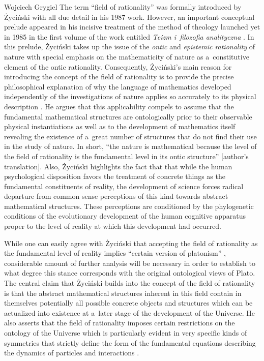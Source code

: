 \begin{artengenv}{Wojciech Grygiel}
The term ``field of rationality'' was formally introduced by Życiński with all due detail in his 1987 work. However, an important conceptual prelude appeared in his incisive treatment of the method of theology launched yet in 1985 in the first volume of the work entitled \textit{Teizm i~filozofia analityczna}
\parencite[][pp.187–207]{zycinski_teizm_1985}. %
 In this prelude, Życiński takes up the issue of the \textit{ontic} and \textit{epistemic rationality} of nature with special emphasis on the mathematicity of nature as a~constitutive element of the ontic rationality. Consequently, Życiński's main reason for introducing the concept of the field of rationality is to provide the precise philosophical explanation of why the language of mathematics developed independently of the investigations of nature applies so accurately to its physical description 
\parencite[][]{zycinski_filozoficzne_1987}. %
 He argues that this applicability compels to assume that the fundamental mathematical structures are ontologically prior to their observable physical instantiations as well as to the development of mathematics itself revealing the existence of a~great number of structures that do not find their use in the study of nature. In short, ``the nature is mathematical because the level of the field of rationality is the fundamental level in its ontic structure'' 
\parencite[][p.176]{zycinski_filozoficzne_1987} %
 [author's translation]. Also, Życiński highlights the fact that that while the human psychological disposition favors the treatment of concrete things as the fundamental constituents of reality, the development of science forces radical departure from common sense perceptions of this kind towards abstract mathematical structures. These perceptions are conditioned by the phylogenetic conditions of the evolutionary development of the human cognitive apparatus proper to the level of reality at which this development had occurred.

While one can easily agree with Życiński that accepting the field of rationality as the fundamental level of reality implies ``certain version of platonism''
\parencite[][p.174]{zycinski_filozoficzne_1987}, %
 considerable amount of further analysis will be necessary in order to establish to what degree this stance corresponds with the original ontological views of Plato. The central claim that Życiński builds into the concept of the field of rationality is that the abstract mathematical structures inherent in this field contain in themselves potentially all possible concrete objects and structures which can be actualized into existence at a~later stage of the development of the Universe. He also asserts that the field of rationality imposes certain restrictions on the ontology of the Universe which is particularly evident in very specific kinds of symmetries that strictly define the form of the fundamental equations describing the dynamics of particles and interactions 
\parencite[][p.180]{zycinski_filozoficzne_1987}.%



\end{artengenv}
